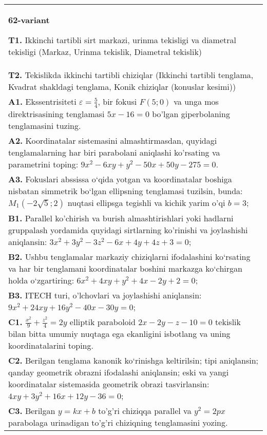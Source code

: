 \documentclass{article}
\begin{document}
\begin{tabular}{m{17cm}}
\textbf{62-variant}
\newline

\textbf{T1.} Ikkinchi tartibli sirt markazi, urinma tekisligi va diametral tekisligi (Markaz, Urinma tekislik, Diametral tekislik) \\
\textbf{T2.} Tekislikda ikkinchi tartibli chiziqlar (Ikkinchi tartibli tenglama, Kvadrat shakldagi tenglama, Konik chiziqlar (konuslar kesimi)) \\
\textbf{A1.} Ekssentrisiteti $\varepsilon=\frac{5}{4}$, bir fokusi $F(5 ; 0)$ va unga mos direktrisasining tenglamasi $5 x-16=0$ bo'lgan giperbolaning tenglamasini tuzing. \\
\textbf{A2.} Koordinatalar sistemasini almashtirmasdan, quyidagi tenglamalarning har biri parabolani aniqlashi ko'rsating va parametrini toping: $9 x^2-6 x y+y^2-50 x+50 y-275=0$. \\
\textbf{A3.} Fokuslari abssissa o‘qida yotgan va koordinatalar boshiga nisbatan simmetrik bo‘lgan ellipsning tenglamasi tuzilsin, bunda: $M_1(-2 \sqrt{5} ; 2)$ nuqtasi ellipsga tegishli va kichik yarim o'qi $b=3$; \\
\textbf{B1.} Parallel ko'chirish va burish almashtirishlari yoki hadlarni gruppalash yordamida quyidagi sirtlarning ko'rinishi va joylashishi aniqlansin: $3 x^2+3 y^2-3 z^2-6 x+4 y+4 z+3=0$; \\
\textbf{B2.} Ushbu tenglamalar markaziy chiziqlarni ifodalashini ko‘rsating va har bir tenglamani koordinatalar boshini markazga ko‘chirgan holda o‘zgartiring: $6 x^2+4 x y+y^2+4 x-2 y+2=0$; \\
\textbf{B3.} ITECH turi, o'lchovlari va joylashishi aniqlansin: $9 x^2+24 x y+16 y^2-40 x-30 y=0$; \\
\textbf{C1.} $\frac{x^2}{9}+\frac{z^2}{4}=2 y$ elliptik paraboloid $2 x-2 y-z-10=0$ tekislik bilan bitta umumiy nuqtaga ega ekanligini isbotlang va uning koordinatalarini toping. \\
\textbf{C2.} Berilgan tenglama kanonik ko‘rinishga keltirilsin; tipi aniqlansin; qanday geometrik obrazni ifodalashi aniqlansin; eski va yangi koordinatalar sistemasida geometrik obrazi tasvirlansin: $4 x y+3 y^2+16 x+12 y-36=0$; \\
\textbf{C3.} Berilgan $y=k x+b$ to'g'ri chiziqqa parallel va $y^2=2 p x$ parabolaga urinadigan to'g'ri chiziqning tenglamasini yozing. \\

\end{tabular}
\vspace{1cm}
\end{document}
